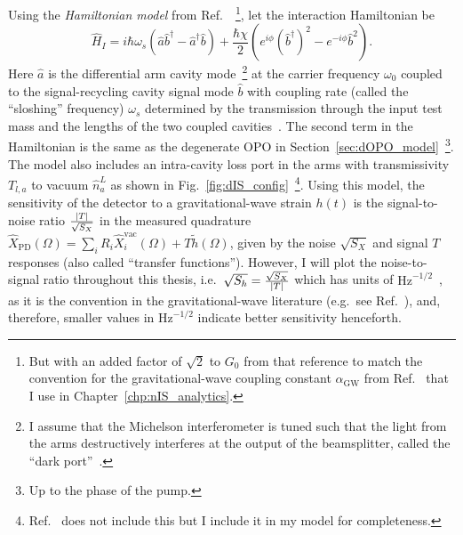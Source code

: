 Using the \emph{Hamiltonian model} from Ref.~\cite{korobkoQuantumExpanderGravitationalwave2019}~\footnote{But with an added factor of $\sqrt{2}$ to $G_0$ from that reference to match the convention for the gravitational-wave coupling constant $\alpha_\text{GW}$ from Ref.~\cite{liBroadbandSensitivityImprovement2020} that I use in Chapter~\ref{chp:nIS_analytics}.}, let the interaction Hamiltonian be
\begin{equation}
\hat{H}_I=i\hbar\omega_s(\hat{a}\hat{b}^\dag-\hat{a}^\dag\hat{b})+\frac{\hbar\chi}{2}(e^{i\phi} (\hat b^\dag)^2 - e^{-i\phi} \hat b^2).
\end{equation}
Here $\hat a$ is the differential arm cavity mode~\footnote{I assume that the Michelson interferometer is tuned such that the light from the arms destructively interferes at the output of the beamsplitter, called the ``dark port''~\cite{bond_2010}.} at the carrier frequency $\omega_0$ coupled to the signal-recycling cavity signal mode $\hat b$ with coupling rate (called the ``sloshing'' frequency) $\omega_s$ determined by the transmission through the input test mass and the lengths of the two coupled cavities~\cite{korobkoQuantumExpanderGravitationalwave2019}. %
The second term in the Hamiltonian is the same as the degenerate OPO in Section~\ref{sec:dOPO_model}~\footnote{Up to the phase of the pump.}.
The model also includes an intra-cavity loss port in the arms with transmissivity $T_{l,a}$ to vacuum $\hat n^L_a$ as shown in Fig.~\ref{fig:dIS_config}~\footnote{Ref.~\cite{korobkoQuantumExpanderGravitationalwave2019} does not include this but I include it in my model for completeness.}. 
Using this model, the sensitivity of the detector to a gravitational-wave strain $h(t)$ is the signal-to-noise ratio $\frac{\abs{T}}{\sqrt{S_X}}$ in the measured quadrature $\hat X_\text{PD}(\Omega)=\sum_i R_i \hat X_i^\text{vac}(\Omega) + T \tilde h(\Omega)$, given by the noise $\sqrt{S_X}$ and signal $T$ responses (also called ``transfer functions''). However, I will plot the noise-to-signal ratio throughout this thesis, i.e.\ $\sqrt{S_h}=\frac{\sqrt{S_X}}{\abs{T}}$ which has units of $\text{Hz}^{-1/2}$~\cite{danilishinQuantumMeasurementTheory2012}, as it is the convention in the gravitational-wave literature (e.g.\ see Ref.~\cite{AdvancedLIGO:2015}), and, therefore, smaller values in $\text{Hz}^{-1/2}$ indicate better sensitivity henceforth. %

